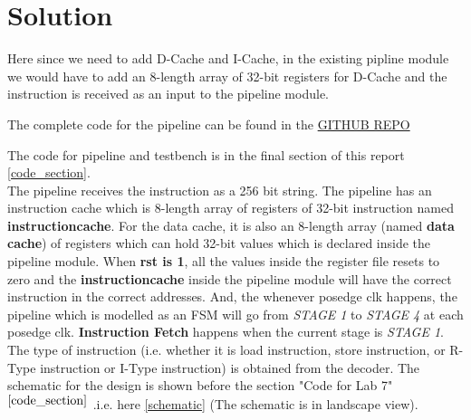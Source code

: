 \section{Solution}
Here since we need to add D-Cache and I-Cache, in the existing pipline module we would have to add an 8-length array of 32-bit registers for D-Cache and the instruction is received as an input to the pipeline module.
  
    


The complete code for the pipeline can be found in the \href{https://github.com/nnk03/PIPELINE-GROUP-13-BATCH-2021-CO-LAB-IIT-PALAKKAD}{GITHUB REPO}

The code for pipeline and testbench is in the final section of this report \ref{code_section}.
\\
The pipeline receives the instruction as a 256 bit string. The pipeline has an instruction cache which is 8-length array of registers of 32-bit instruction named \textbf{instruction\textunderscore cache}.
For the data cache, it is also an 8-length array (named \textbf{data\textunderscore
cache}) of registers which can hold 32-bit values which is declared inside the pipeline module. When \textbf{rst is 1}, all the values inside the register file resets to zero and the \textbf{instruction\textunderscore cache} inside the pipeline module will have the correct instruction in the correct addresses. And, the whenever posedge clk happens, the pipeline which is modelled as an FSM will go from \textit{STAGE 1} to \textit{STAGE 4} at each posedge clk. \textbf{Instruction Fetch} happens when the current stage is \textit{STAGE 1}.
The type of instruction (i.e. whether it is load instruction, store instruction, or R-Type instruction or I-Type instruction) is obtained from the decoder. 
The schematic for the design is shown before the section "Code for Lab 7"$^{\ref{code_section}}$ .i.e. here \ref{schematic} (The schematic is in landscape view).

